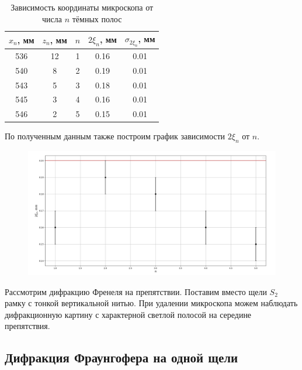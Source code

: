 \documentclass[a4paper,12pt]{article}
\theoremstyle{definition}
\begin{document}
\begin{table}[H]
	\label{table1}	
	\begin{center}
		\begin{tabular}{|c|c|c|c|c|}
			\hline
			$ x_n $, мм  & $ z_n $, мм & $ n $& $ 2\xi_n $, мм& $ \sigma_{2\xi_n} $, мм\\
			\hline
			536 &	12	&	1   & 0.16  & 0.01
			\\ \hline
			540	&	8	&	2   & 0.19  & 0.01
			\\ \hline
			543	&	5	&	3   & 0.18  & 0.01
			\\ \hline
			545	& 	3	&	4   & 0.16  & 0.01
			\\ \hline
			546	&	2	&	5   & 0.15  & 0.01	\\
			\hline
		\end{tabular}
	\end{center}
	\caption{Зависимость координаты микроскопа от числа $ n $ тёмных полос}
\end{table}

По полученным данным также построим график зависимости $ 2\xi_n $ от $ n $.

\begin{figure}[h!]
	\begin{center}
		\includegraphics[width=19cm]{1.png}
	\end{center}
\end{figure}

Рассмотрим дифракцию Френеля на препятствии. Поставим вместо щели $ S_2 $ рамку с тонкой вертикальной нитью. При удалении микроскопа можем наблюдать дифракционную картину с характерной светлой полосой на середине препятствия.

\subsection{Дифракция Фраунгофера на одной щели}
\end{document}

